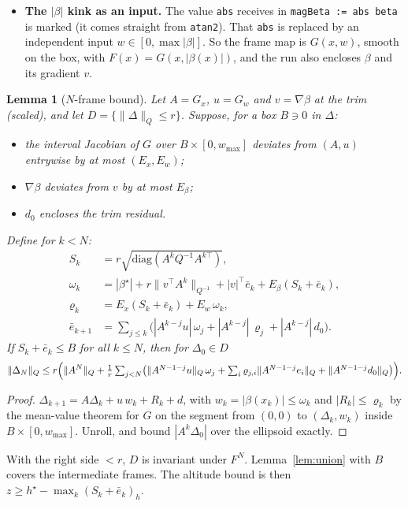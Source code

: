\documentclass[11pt]{article}
\newtheorem{lemma}[theorem]{Lemma}
\begin{document}
\begin{itemize}
\item \textbf{The $|\beta|$ kink as an input.} The value \texttt{abs} receives in \texttt{magBeta := abs beta} is marked (it comes straight from \texttt{atan2}). That \texttt{abs} is replaced by an independent input $w \in [0, \max|\beta|]$. So the frame map is $G(x, w)$, smooth on the box, with $F(x) = G(x, |\beta(x)|)$, and the run also encloses $\beta$ and its gradient $v$.
\end{itemize}

\begin{lemma}[$N$-frame bound]\label{lem:nframe}
Let $A = G_x$, $u = G_w$ and $v = \nabla\beta$ at the trim (scaled), and let $D = \{\|\Delta\|_Q \le r\}$. Suppose, for a box $B \ni 0$ in $\Delta$:
\begin{itemize}
\item the interval Jacobian of $G$ over $B \times [0, w_{\max}]$ deviates from $(A, u)$ entrywise by at most $(E_x, E_w)$;
\item $\nabla\beta$ deviates from $v$ by at most $E_\beta$;
\item $d_0$ encloses the trim residual.
\end{itemize}
Define for $k < N$:
\begin{align*}
S_k &= r\sqrt{\mathrm{diag}(A^k Q^{-1} A^{k\top})},\\
\omega_k &= |\beta^\star| + r\|v^\top A^k\|_{Q^{-1}} + |v|^\top\bar e_k + E_\beta(S_k + \bar e_k),\\
\varrho_k &= E_x(S_k + \bar e_k) + E_w\,\omega_k,\\
\bar e_{k+1} &= \textstyle\sum_{j\le k} \bigl(|A^{k-j}u|\,\omega_j + |A^{k-j}|\,\varrho_j + |A^{k-j}|\,d_0\bigr).
\end{align*}
If $S_k + \bar e_k \le B$ for all $k \le N$, then for $\Delta_0 \in D$
\[ \|\Delta_N\|_Q \le r\Bigl(\|A^N\|_Q + \tfrac1r\textstyle\sum_{j<N}\bigl(\|A^{N-1-j}u\|_Q\,\omega_j + \sum_i \varrho_{j,i}\|A^{N-1-j}e_i\|_Q + \|A^{N-1-j}d_0\|_Q\bigr)\Bigr). \]
\end{lemma}
\begin{proof}
$\Delta_{k+1} = A\Delta_k + u\,w_k + R_k + d$, with $w_k = |\beta(x_k)| \le \omega_k$ and $|R_k| \le \varrho_k$ by the mean-value theorem for $G$ on the segment from $(0,0)$ to $(\Delta_k, w_k)$ inside $B \times [0, w_{\max}]$. Unroll, and bound $|A^k\Delta_0|$ over the ellipsoid exactly.
\end{proof}

With the right side $< r$, $D$ is invariant under $F^N$. Lemma~\ref{lem:union} with $B$ covers the intermediate frames. The altitude bound is then $z \ge h^\star - \max_{k}(S_k + \bar e_k)_h$.
\end{document}
